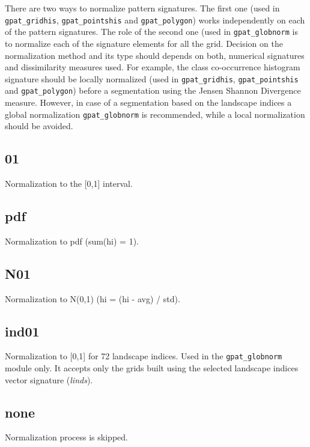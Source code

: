 There are two ways to normalize pattern signatures.
The first one (used in {\tt gpat\_gridhis}, {\tt gpat\_pointshis} and {\tt gpat\_polygon}) works independently on each of the pattern signatures.
The role of the second one (used in {\tt gpat\_globnorm} is to normalize each of the signature elements for all the grid. 
Decision on the normalization method and its type should depends on both, numerical signatures and dissimilarity measures used.
For example, the class co-occurrence histogram signature should be locally normalized (used in {\tt gpat\_gridhis}, {\tt gpat\_pointshis} and {\tt gpat\_polygon}) before a segmentation using the Jensen Shannon Divergence measure.
However, in case of a segmentation based on the landscape indices a global normalization {\tt gpat\_globnorm} is recommended, while a local normalization should be avoided.

\subsection{01}

Normalization to the [0,1] interval.

\subsection{pdf}

Normalization to pdf (sum(hi) = 1).

\subsection{N01}

Normalization to N(0,1) (hi = (hi - avg) / std).

\subsection{ind01}

Normalization to [0,1] for 72 landscape indices.
Used in the {\tt gpat\_globnorm} module only.
It accepts only the grids built using the selected landscape indices vector signature ({\it linds}).

\subsection{none}

Normalization process is skipped. 
